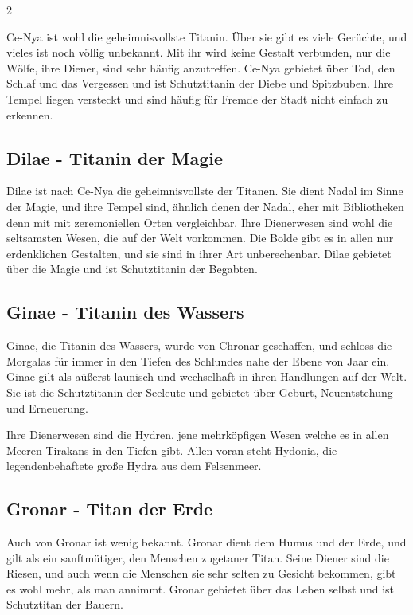 \begin{multicols}{2}
{Ce-Nya ist wohl die geheimnisvollste Titanin.
Über sie gibt es viele Gerüchte, und vieles ist noch völlig unbekannt.
Mit ihr wird keine Gestalt verbunden, nur die Wölfe, ihre Diener, sind sehr häufig anzutreffen.
Ce-Nya gebietet über Tod, den Schlaf und das Vergessen und ist Schutztitanin der Diebe und Spitzbuben.
Ihre Tempel liegen versteckt und sind häufig für Fremde der Stadt nicht einfach zu erkennen.

\subsection{Dilae - Titanin der Magie}\label{subsec:dilae-titanin-der-magie}

Dilae ist nach Ce-Nya die geheimnisvollste der Titanen.
Sie dient Nadal im Sinne der Magie, und ihre Tempel sind, ähnlich denen der Nadal, eher mit Bibliotheken denn mit mit zeremoniellen Orten vergleichbar.
Ihre Dienerwesen sind wohl die seltsamsten Wesen, die auf der Welt vorkommen.
Die Bolde gibt es in allen nur erdenklichen Gestalten, und sie sind in ihrer Art unberechenbar.
Dilae gebietet über die Magie und ist Schutztitanin der Begabten.

\subsection{Ginae - Titanin des Wassers}\label{subsec:ginae-titanin-des-wassers}

Ginae, die Titanin des Wassers, wurde von Chronar geschaffen, und schloss die Morgalas für immer in den Tiefen des Schlundes nahe der Ebene von Jaar ein.
Ginae gilt als aüßerst launisch und wechselhaft in ihren Handlungen auf der Welt.
Sie ist die Schutztitanin der Seeleute und gebietet über Geburt, Neuentstehung und Erneuerung.

Ihre Dienerwesen sind die Hydren, jene mehrköpfigen Wesen welche es in allen Meeren Tirakans in den Tiefen gibt.
Allen voran steht Hydonia, die legendenbehaftete große Hydra aus dem Felsenmeer.

\subsection{Gronar - Titan der Erde}\label{subsec:gronar-titan-der-erde}

Auch von Gronar ist wenig bekannt.
Gronar dient dem Humus und der Erde, und gilt als ein sanftmütiger, den Menschen zugetaner Titan.
Seine Diener sind die Riesen, und auch wenn die Menschen sie sehr selten zu Gesicht bekommen, gibt es wohl mehr, als man annimmt.
Gronar gebietet über das Leben selbst und ist Schutztitan der Bauern.

}
\end{multicols}
